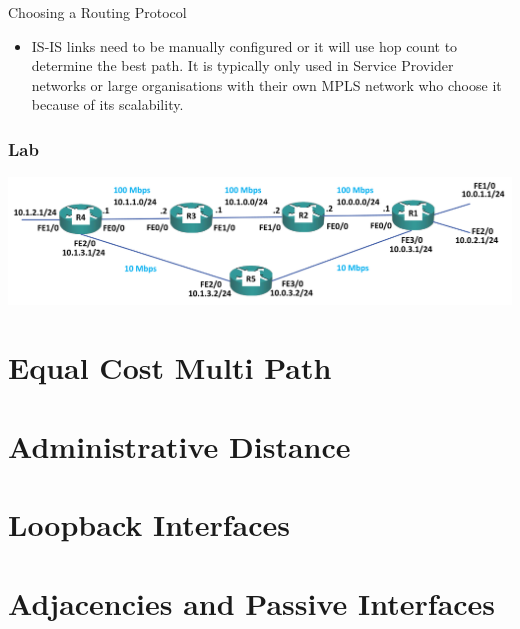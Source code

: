 \documentclass[pdflatex,compress,mathserif]{beamer}
\begin{document}
\begin{frame}{Choosing a Routing Protocol}
	\begin{itemize}
		\item IS-IS links need to be manually configured or it will use hop count to
determine the best path. It is typically only used in Service Provider
networks or large organisations with their own MPLS network who
choose it because of its scalability.
	\end{itemize}
\end{frame}

\begin{frame}
	\frametitle{Lab}
	\begin{center}
		\includegraphics[width=\linewidth]{img/img23}
	\end{center}
\end{frame}

\section{Equal Cost Multi Path}

\section{Administrative Distance}

\section{Loopback Interfaces}

\section{Adjacencies and Passive Interfaces}
\end{document}
